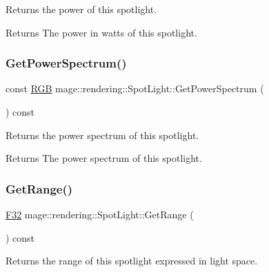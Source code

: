 Returns the power of this spotlight.

\begin{DoxyReturn}{Returns}
The power in watts of this spotlight. 
\end{DoxyReturn}
\mbox{\label{classmage_1_1rendering_1_1_spot_light_a6dfa36c830bfa2878c04740c8c5f2e3b}} 
\subsubsection{\texorpdfstring{Get\+Power\+Spectrum()}{GetPowerSpectrum()}}
{\footnotesize\ttfamily const \mbox{\hyperlink{structmage_1_1_r_g_b}{R\+GB}} mage\+::rendering\+::\+Spot\+Light\+::\+Get\+Power\+Spectrum (\begin{DoxyParamCaption}{ }\end{DoxyParamCaption}) const\hspace{0.3cm}{\ttfamily [noexcept]}}

Returns the power spectrum of this spotlight.

\begin{DoxyReturn}{Returns}
The power spectrum of this spotlight. 
\end{DoxyReturn}
\mbox{\label{classmage_1_1rendering_1_1_spot_light_a14383d05dafe535cf0cc162e3015181e}} 
\subsubsection{\texorpdfstring{Get\+Range()}{GetRange()}}
{\footnotesize\ttfamily \mbox{\hyperlink{namespacemage_aa97e833b45f06d60a0a9c4fc22ae02c0}{F32}} mage\+::rendering\+::\+Spot\+Light\+::\+Get\+Range (\begin{DoxyParamCaption}{ }\end{DoxyParamCaption}) const\hspace{0.3cm}{\ttfamily [noexcept]}}

Returns the range of this spotlight expressed in light space.

